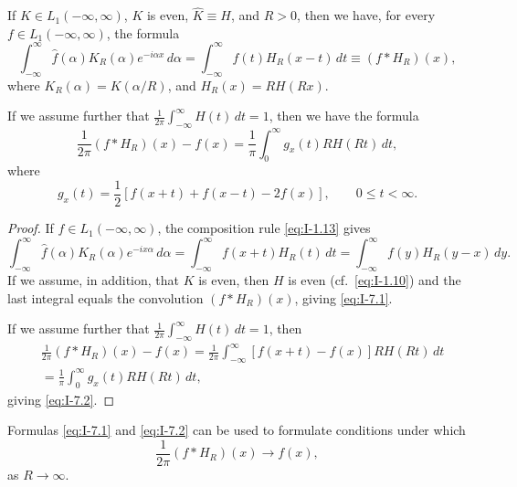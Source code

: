 \begin{theorem}\label{thm:I-8}
If $K\in L_1(-\infty,\infty)$, $K$ is even, $\hat K\equiv H$, and $R>0$, then we have, for every $f\in L_1(-\infty,\infty)$, the formula
\begin{equation}\label{eq:I-7.1}
\int_{-\infty}^{\infty}\hat f(\alpha)K_R(\alpha)e^{-i\alpha x}\,d\alpha
=\int_{-\infty}^{\infty}f(t)H_R(x-t)\,dt
\equiv(f*H_R)(x),
\end{equation}
where $K_R(\alpha)=K(\alpha/R)$, and $H_R(x)=RH(Rx)$.

If we assume further that $\frac{1}{2\pi}\int_{-\infty}^{\infty}H(t)\,dt=1$, then we have the formula
\begin{equation}\label{eq:I-7.2}
\frac{1}{2\pi}(f*H_R)(x)-f(x)
=\frac{1}{\pi}\int_0^\infty g_x(t)RH(Rt)\,dt,
\end{equation}
where
\begin{equation}\label{eq:I-7.3}
g_x(t)=\frac12[f(x+t)+f(x-t)-2f(x)],\qquad 0\le t<\infty.
\end{equation}
\end{theorem}

\begin{proof}
If $f\in L_1(-\infty,\infty)$, the composition rule \eqref{eq:I-1.13} gives
\begin{equation}\label{eq:I-7.4}
\int_{-\infty}^{\infty}\hat f(\alpha)K_R(\alpha)e^{-ix\alpha}\,d\alpha
=\int_{-\infty}^{\infty}f(x+t)H_R(t)\,dt
=\int_{-\infty}^{\infty}f(y)H_R(y-x)\,dy.
\end{equation}
If we assume, in addition, that $K$ is even, then $H$ is even (cf.\ \eqref{eq:I-1.10}) and the last integral equals the convolution $(f*H_R)(x)$, giving \eqref{eq:I-7.1}.

If we assume further that $\frac{1}{2\pi}\int_{-\infty}^{\infty}H(t)\,dt=1$, then
\begin{equation*}
\begin{aligned}
&\frac{1}{2\pi}(f*H_R)(x)-f(x) = \frac{1}{2\pi}\int_{-\infty}^{\infty}[f(x+t)-f(x)]RH(Rt)\,dt\\
&= \frac{1}{\pi}\int_0^\infty g_x(t)RH(Rt)\,dt,
\end{aligned}
\end{equation*}
giving \eqref{eq:I-7.2}.
\end{proof}

Formulas \eqref{eq:I-7.1} and \eqref{eq:I-7.2} can be used to formulate conditions under which
\begin{equation*}
\frac{1}{2\pi}(f*H_R)(x)\to f(x),
\end{equation*}
as $R\to\infty$.

